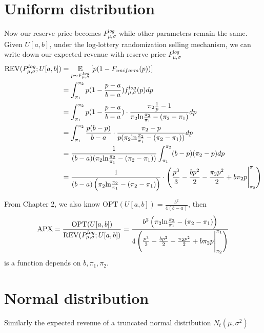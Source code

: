 \section{Uniform distribution}
Now our reserve price becomes $P^{log}_{\mu,\sigma}$ while other parameters remain the same. Given $U[a,b]$, under the log-lottery randomization selling mechanism, we can write down our expected revenue with reserve price $P^{log}_{\mu,\sigma}$  
\begin{equation}\notag
\begin{split}	
	\text{REV}(P^{log}_{\mu,\sigma} ;U[a,b]) &=\underset{ p \sim F^{log}_{\mu,\sigma} }{\mathbb{E}}\left[ p(1-F_{uniform}(p))\right] \\ &= \int_{\pi_1}^{\pi_2} p(1 -  \frac{p-a}{b-a})f^{log}_{\mu,\sigma}(p)dp\\ &=\int_{\pi_1}^{\pi_2} p(1 -  \frac{p-a}{b-a}) \cdot \frac{\pi_2\frac{1}{p} -1}{\pi_2 \text{ln}\frac{\pi_2}{\pi_1} - (\pi_2-\pi_1)} dp \\&=\int_{\pi_1}^{\pi_2} \frac{p(b-p)}{b-a} \cdot \frac{\pi_2 -p}{p(\pi_2 \text{ln}\frac{\pi_2}{\pi_1} - (\pi_2-\pi_1))} dp \\&=  \frac{1}{(b-a)(\pi_2 \text{ln}\frac{\pi_2}{\pi_1} - (\pi_2-\pi_1))}\int_{\pi_1}^{\pi_2} (b-p)(\pi_2-p)dp\\&=  \frac{1}{(b-a)\left(\pi_2 \text{ln}\frac{\pi_2}{\pi_1} - (\pi_2-\pi_1)\right)} \cdot \left( \frac{p^3}{3} -\frac{bp^2}{2} -\frac{\pi_2p^2}{2} + b\pi_2 p \Biggr|_{\pi_2}^{\pi_1} \right)              
\end{split}
\end{equation} 

From Chapter 2, we also know $\text{OPT}(U[a,b]) = \frac{b^{2}}{4(b-a)}$, then
\begin{equation}\notag
    \text{APX} = \frac{\text{OPT}(U[a,b])}{\text{REV}(P^{log}_{\mu,\sigma} ;U[a,b])} = \frac{b^2\left(\pi_2 \text{ln}\frac{\pi_2}{\pi_1} - (\pi_2-\pi_1)\right)}{4\left( \frac{p^3}{3} -\frac{bp^2}{2} -\frac{\pi_2p^2}{2} + b\pi_2 p \Biggr|_{\pi_2}^{\pi_1} \right)  }
\end{equation}
is a function depends on $b, \pi_1, \pi_2$. 

\section{Normal distribution}
Similarly the expected revenue of a truncated normal distribution $N_t(\mu, \sigma^2)$

